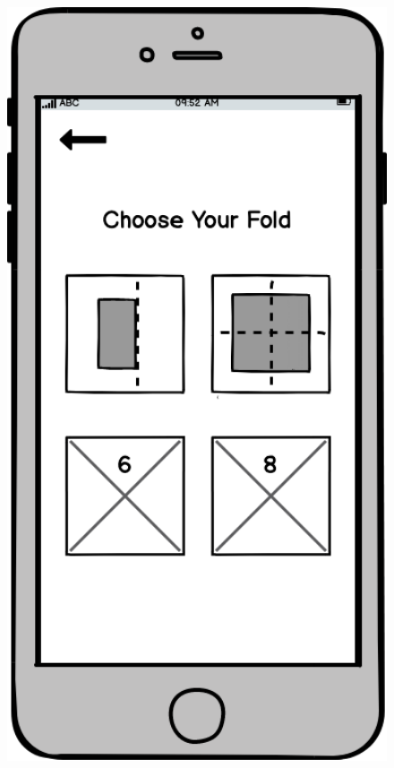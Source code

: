\documentclass[11pt]{article}
\begin{document}
\begin{figure}
\begin{minipage}[c]{0.35\textwidth}
                \includegraphics[width=1\textwidth]{Images/Prototype/prototypeChooseFold}
                \end{minipage}
            \end{figure}
            
\end{document}
